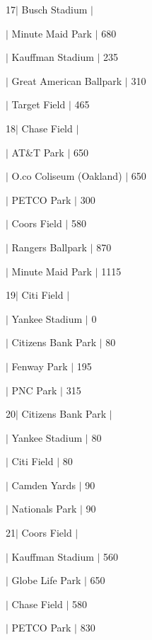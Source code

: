 17$\vert$ Busch Stadium $\vert$
\begin{DoxyItemize}
\item $\vert$ Minute Maid Park $\vert$ 680
\item $\vert$ Kauffman Stadium $\vert$ 235
\item $\vert$ Great American Ballpark $\vert$ 310
\item $\vert$ Target Field $\vert$ 465
\end{DoxyItemize}

18$\vert$ Chase Field $\vert$
\begin{DoxyItemize}
\item $\vert$ AT\&T Park $\vert$ 650
\item $\vert$ O.\+co Coliseum (Oakland) $\vert$ 650
\item $\vert$ P\+E\+T\+CO Park $\vert$ 300
\item $\vert$ Coors Field $\vert$ 580
\item $\vert$ Rangers Ballpark $\vert$ 870
\item $\vert$ Minute Maid Park $\vert$ 1115
\end{DoxyItemize}

19$\vert$ Citi Field $\vert$
\begin{DoxyItemize}
\item $\vert$ Yankee Stadium $\vert$ 0
\item $\vert$ Citizens Bank Park $\vert$ 80
\item $\vert$ Fenway Park $\vert$ 195
\item $\vert$ P\+NC Park $\vert$ 315
\end{DoxyItemize}

20$\vert$ Citizens Bank Park $\vert$
\begin{DoxyItemize}
\item $\vert$ Yankee Stadium $\vert$ 80
\item $\vert$ Citi Field $\vert$ 80
\item $\vert$ Camden Yards $\vert$ 90
\item $\vert$ Nationals Park $\vert$ 90
\end{DoxyItemize}

21$\vert$ Coors Field $\vert$
\begin{DoxyItemize}
\item $\vert$ Kauffman Stadium $\vert$ 560
\item $\vert$ Globe Life Park $\vert$ 650
\item $\vert$ Chase Field $\vert$ 580
\item $\vert$ P\+E\+T\+CO Park $\vert$ 830
\end{DoxyItemize}

